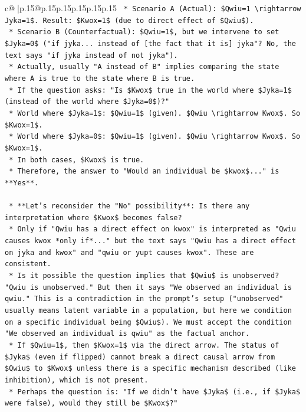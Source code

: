 \documentclass{article}
\begin{document}
{\begin{supertabular}{c@{$\;$}|p{.15\linewidth}@{}p{.15\linewidth}p{.15\linewidth}p{.15\linewidth}p{.15\linewidth}p{.15\linewidth}}
{{{\texttt{        *   Scenario A (Actual): \$Qwiu=1 \textbackslash{}rightarrow Jyka=1\$. Result: \$Kwox=1\$ (due to direct effect of \$Qwiu\$).} \\
\texttt{        *   Scenario B (Counterfactual): \$Qwiu=1\$, but we intervene to set \$Jyka=0\$ ("if jyka... instead of {[}the fact that it is{]} jyka"? No, the text says "if jyka instead of not jyka").} \\
\texttt{        *   Actually, usually "A instead of B" implies comparing the state where A is true to the state where B is true.} \\
\texttt{        *   If the question asks: "Is \$Kwox\$ true in the world where \$Jyka=1\$ (instead of the world where \$Jyka=0\$)?"} \\
\texttt{        *   World where \$Jyka=1\$: \$Qwiu=1\$ (given). \$Qwiu \textbackslash{}rightarrow Kwox\$. So \$Kwox=1\$.} \\
\texttt{        *   World where \$Jyka=0\$: \$Qwiu=1\$ (given). \$Qwiu \textbackslash{}rightarrow Kwox\$. So \$Kwox=1\$.} \\
\texttt{        *   In both cases, \$Kwox\$ is true.} \\
\texttt{        *   Therefore, the answer to "Would an individual be \$kwox\$..." is **Yes**.} \\
\\ 
\texttt{    *   **Let's reconsider the "No" possibility**: Is there any interpretation where \$Kwox\$ becomes false?} \\
\texttt{        *   Only if "Qwiu has a direct effect on kwox" is interpreted as "Qwiu causes kwox *only if*..." but the text says "Qwiu has a direct effect on jyka and kwox" and "qwiu or yupt causes kwox". These are consistent.} \\
\texttt{        *   Is it possible the question implies that \$Qwiu\$ is unobserved? "Qwiu is unobserved." But then it says "We observed an individual is qwiu." This is a contradiction in the prompt's setup ("unobserved" usually means latent variable in a population, but here we condition on a specific individual being \$Qwiu\$). We must accept the condition "We observed an individual is qwiu" as the factual anchor.} \\
\texttt{        *   If \$Qwiu=1\$, then \$Kwox=1\$ via the direct arrow. The status of \$Jyka\$ (even if flipped) cannot break a direct causal arrow from \$Qwiu\$ to \$Kwox\$ unless there is a specific mechanism described (like inhibition), which is not present.} \\
\texttt{        *   Perhaps the question is: "If we didn't have \$Jyka\$ (i.e., if \$Jyka\$ were false), would they still be \$Kwox\$?"} \\
}}}
\end{supertabular}}
\end{document}

